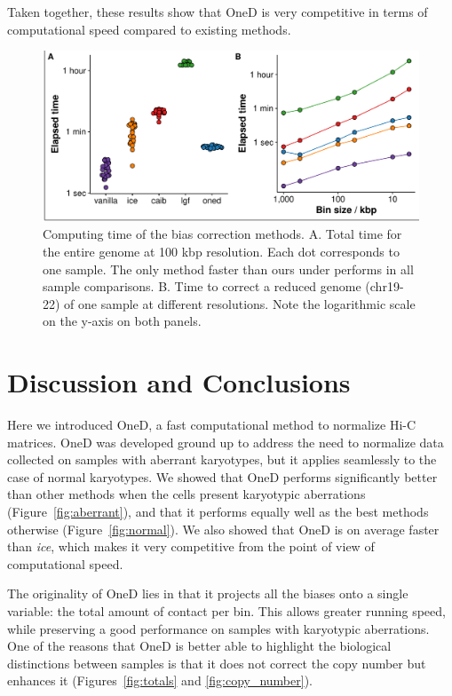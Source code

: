 \documentclass{bioinfo}
\begin{document}
Taken together, these results show that OneD is very competitive in terms
of computational speed compared to existing methods.

\begin{figure}
\centerline{\includegraphics[width=.5\textwidth]{img/times_figure5.pdf}}
\caption{
Computing time of the bias correction methods. A. Total time for the entire genome at 100 kbp resolution. Each dot corresponds to
one sample. The only method faster than ours under performs in all sample
comparisons. B. Time to correct a reduced genome (chr19-22) of one sample at different resolutions. Note the logarithmic scale on the y-axis on both panels.}
\label{fig:times}
\end{figure}






\section{Discussion and Conclusions}

Here we introduced OneD, a fast computational method to normalize Hi-C
matrices. OneD was developed ground up to address the need to normalize
data collected on samples with aberrant karyotypes, but it applies
seamlessly to the case of normal karyotypes. We showed that OneD performs
significantly better than other methods when the cells present karyotypic
aberrations (Figure~\ref{fig:aberrant}), and that it performs equally well
as the best methods otherwise (Figure~\ref{fig:normal}). We also showed
that OneD is on average faster than \textit{ice}, which makes it very
competitive from the point of view of computational speed.

The originality of OneD lies in that it projects all the biases onto a
single variable: the total amount of contact per bin. This allows greater
running speed, while preserving a good performance on samples with
karyotypic aberrations. One of the reasons that OneD is better able to
highlight the biological distinctions between samples is that it does not
correct the copy number but enhances it (Figures~\ref{fig:totals} and
\ref{fig:copy_number}).
\end{document}
